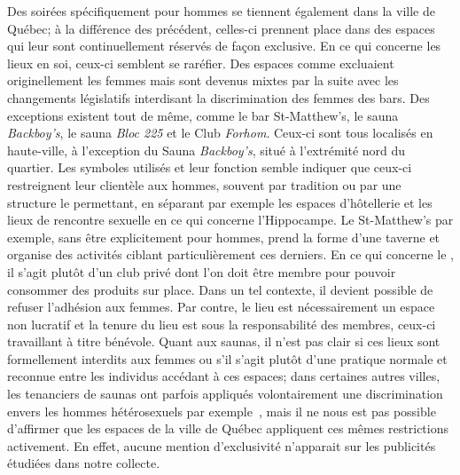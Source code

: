 Des soirées spécifiquement pour hommes se tiennent également dans la ville de Québec; à la différence des précédent, celles-ci prennent place dans des espaces qui leur sont continuellement réservés de façon exclusive.
En ce qui concerne les lieux en soi, ceux-ci semblent se raréfier.
Des espaces comme  excluaient originellement les femmes mais sont devenus mixtes par la suite avec les changements législatifs interdisant la discrimination des femmes des bars.
Des exceptions existent tout de même, comme le bar St-Matthew's, le sauna \emph{Backboy's}, le sauna \emph{Bloc 225} et le Club \emph{Forhom}.
Ceux-ci sont tous localisés en haute-ville, à l'exception du Sauna \emph{Backboy's}, situé à l'extrémité nord du quartier.
Les symboles utilisés et leur fonction semble indiquer que ceux-ci restreignent leur clientèle aux hommes, souvent par tradition ou par une structure le permettant, en séparant par exemple les espaces d'hôtellerie et les lieux de rencontre sexuelle en ce qui concerne l'Hippocampe.
Le St-Matthew's par exemple, sans être explicitement pour hommes, prend la forme d'une taverne et organise des activités ciblant particulièrement ces derniers.
En ce qui concerne le , il s'agit plutôt d'un club privé dont l'on doit être membre pour pouvoir consommer des produits sur place.
Dans un tel contexte, il devient possible de refuser l'adhésion aux femmes.
Par contre, le lieu est nécessairement un espace non lucratif et la tenure du lieu est sous la responsabilité des membres, ceux-ci travaillant à titre bénévole.
Quant aux saunas, il n'est pas clair si ces lieux sont formellement interdits aux femmes ou s'il s'agit plutôt d'une pratique normale et reconnue entre les individus accédant à ces espaces; dans certaines autres villes, les tenanciers de saunas ont parfois appliqués volontairement une discrimination envers les hommes hétérosexuels par exemple~\citep{Matejskova2012}, mais il ne nous est pas possible d'affirmer que les espaces de la ville de Québec appliquent ces mêmes restrictions activement.
En effet, aucune mention d'exclusivité n'apparait sur les publicités étudiées dans notre collecte.

